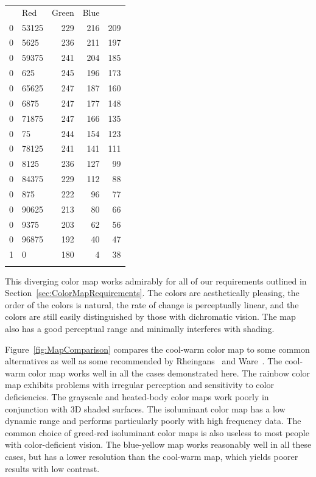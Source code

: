 \documentclass{llncs}
\newcommand{\scite}[1]{~\cite{#1}}
\begin{document}
{\begin{table}
\begin{tabular}{r@{.}l@{\qquad}rrr}
    		&	Red	&	Green	&	Blue	\\
    \noalign{\smallskip}
    \hline
    \noalign{\smallskip}
    0&53125	&	229	&	216	&	209	\\
    0&5625	&	236	&	211	&	197	\\
    0&59375	&	241	&	204	&	185	\\
    0&625	&	245	&	196	&	173	\\
    0&65625	&	247	&	187	&	160	\\
    0&6875	&	247	&	177	&	148	\\
    0&71875	&	247	&	166	&	135	\\
    0&75	&	244	&	154	&	123	\\
    0&78125	&	241	&	141	&	111	\\
    0&8125	&	236	&	127	&	99	\\
    0&84375	&	229	&	112	&	88	\\
    0&875	&	222	&	96	&	77	\\
    0&90625	&	213	&	80	&	66	\\
    0&9375	&	203	&	62	&	56	\\
    0&96875	&	192	&	40	&	47	\\
    1&0		&	180	&	4	&	38      \\
    \\
    \hline
  \end{tabular}
  \label{table:Cool2WarmRGB}
\end{table}
}{}

This diverging color map works admirably for all of our
requirements outlined in
Section~\ref{sec:ColorMapRequirements}.  The colors are aesthetically
pleasing, the order of the colors is natural, the rate of change is
perceptually linear, and the colors are still easily distinguished by those
with dichromatic vision.  The map also has a good perceptual range and
minimally interferes with shading.

Figure~\ref{fig:MapComparison} compares the cool-warm color map to some
common alternatives as well as some recommended by
Rheingans\scite{Rheingans99} and Ware\scite{Ware04}.  The cool-warm color
map works well in all the cases demonstrated here.  The rainbow color map
exhibits problems with irregular perception and sensitivity to color
deficiencies.  The grayscale and heated-body color maps work poorly in
conjunction with 3D shaded surfaces.  The isoluminant color map has a low
dynamic range and performs particularly poorly with high frequency data.
The common choice of greed-red isoluminant color maps is also useless to
most people with color-deficient vision.  The blue-yellow map works
reasonably well in all these cases, but has a lower resolution than the
cool-warm map, which yields poorer results with low contrast.
\end{document}
